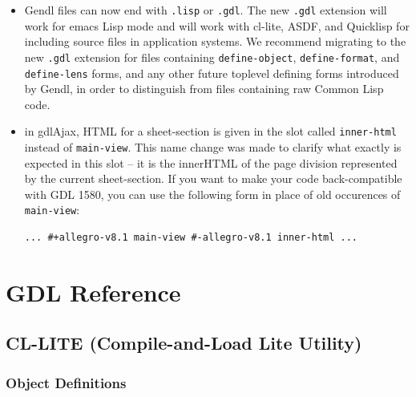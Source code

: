 \documentclass [11pt]{book}
\begin{document}
\begin{itemize}
\item Gendl files can now end with \texttt{.lisp} or \texttt{.gdl}. The new \texttt{.gdl} extension will work for emacs Lisp mode and will work with
	 cl-lite, ASDF, and Quicklisp for including source files in application systems. We recommend migrating
to the new \texttt{.gdl} extension for files containing \texttt{define-object}, \texttt{define-format}, and \texttt{define-lens} forms, and any other future toplevel defining forms introduced by Gendl, in order to distinguish 
from files containing raw Common Lisp code.

\item in gdlAjax, HTML for a sheet-section is given in the slot called \texttt{inner-html} instead of \texttt{main-view}. This name change was made to clarify what exactly is
	 expected in this slot -- it is the innerHTML of the page
	 division represented by the current sheet-section. If you
	 want to make your code back-compatible with GDL 1580, you can
	 use the following form in place of old occurences of \texttt{main-view}: 

\begin{verbatim}... #+allegro-v8.1 main-view #-allegro-v8.1 inner-html ...
\end{verbatim}

\end{itemize}



\chapter{GDL Reference}

\label{chap:gdlreference}



\section{CL-LITE (Compile-and-Load Lite Utility)}

\label{sec:cl-lite(compile-and-loadliteutility)}





\subsection{Object Definitions}

\label{subsec:objectdefinitions}
\end{document}
